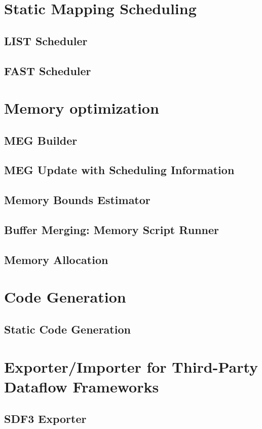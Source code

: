 \documentclass[10pt,letterpaper]{report}
\begin{document}
	\newpage
	\section{Static Mapping Scheduling}
	\label{sec:static_mapping_scheduling}
	\subsection{LIST Scheduler}
	\subsection{FAST Scheduler}
	
	\section{Memory optimization}
	\subsection{MEG Builder}
	\subsection{MEG Update with Scheduling Information}
	\subsection{Memory Bounds Estimator}
	\label{sec:memory_bounds_estimator}
	\subsection{Buffer Merging: Memory Script Runner}
	\subsection{Memory Allocation}
	
	\section{Code Generation}
	\subsection{Static Code Generation}
	
	\section{Exporter/Importer for Third-Party Dataflow Frameworks}
	\subsection{SDF3 Exporter}
\end{document}
